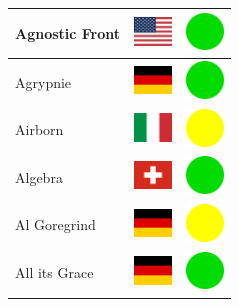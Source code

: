\documentclass[12pt, a4paper, twoside]{report}
\begin{document}
\begin{center}
\begin{longtable}{|p{5cm}|p{2cm}|p{2cm}|}
Agnostic Front & \includegraphics[width=1cm]{4x3/us} & \includegraphics[width=1cm]{likes/y} \\ \hline
Agrypnie & \includegraphics[width=1cm]{4x3/de} & \includegraphics[width=1cm]{likes/y} \\ \hline
Airborn & \includegraphics[width=1cm]{4x3/it} & \includegraphics[width=1cm]{likes/m} \\ \hline
Algebra & \includegraphics[width=1cm]{4x3/ch} & \includegraphics[width=1cm]{likes/y} \\ \hline
Al Goregrind & \includegraphics[width=1cm]{4x3/de} & \includegraphics[width=1cm]{likes/m} \\ \hline
All its Grace & \includegraphics[width=1cm]{4x3/de} & \includegraphics[width=1cm]{likes/y} \\ \hline

\end{longtable}
\end{center}
\end{document}

